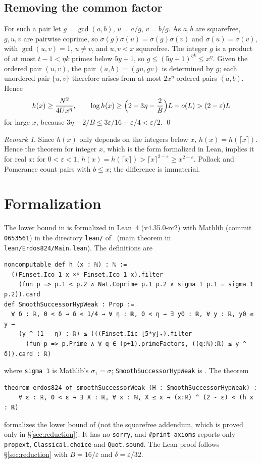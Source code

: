 \documentclass[11pt]{amsart}
\theoremstyle{definition}
\theoremstyle{remark}
\newtheorem{remark}[theorem]{Remark}
\newcommand{\eps}{\varepsilon}
\begin{document}
\subsection{Removing the common factor} For such a pair let $g=\gcd(a,b)$, $u=a/g$, $v=b/g$. As $a,b$ are squarefree, $g,u,v$ are pairwise coprime, so $\sigma(g)\sigma(u)=\sigma(g)\sigma(v)$ and $\sigma(u)=\sigma(v)$, with $\gcd(u,v)=1$, $u\ne v$, and $u,v<x$ squarefree. The integer $g$ is a product of at most $t-1<\eta k$ primes below $5y+1$, so $g\le(5y+1)^{\eta k}\le x^\eta$. Given the ordered pair $(u,v)$, the pair $(a,b)=(gu,gv)$ is determined by $g$; each unordered pair $\{u,v\}$ therefore arises from at most $2x^\eta$ ordered pairs $(a,b)$. Hence
\[
 h(x)\ge\frac{N^2}{4Ux^\eta},\qquad
 \log h(x)\ge\Bigl(2-3\eta-\frac2B\Bigr)L-o(L)>(2-\eps)L
\]
for large $x$, because $3\eta+2/B\le3\eps/16+\eps/4<\eps/2$. \qed

\begin{remark}
Since $h(x)$ only depends on the integers below $x$, $h(x)=h(\lceil x\rceil)$. Hence the theorem for integer $x$, which is the form formalized in Lean, implies it for real $x$: for $0<\eps<1$, $h(x)=h(\lceil x\rceil)>\lceil x\rceil^{2-\eps}\ge x^{2-\eps}$. Pollack and Pomerance count pairs with $b\le x$; the difference is immaterial.
\end{remark}

\section{Formalization}\label{sec:lean}

The lower bound in  is formalized in Lean~4 (v4.35.0-rc2) with Mathlib (commit \texttt{0653561}) in the directory \texttt{lean/} of~\cite{repo} (main theorem in \texttt{lean/Erdos824/Main.lean}). The definitions are
\begin{verbatim}
noncomputable def h (x : ℕ) : ℕ :=
  ((Finset.Ico 1 x ×ˢ Finset.Ico 1 x).filter
    (fun p => p.1 < p.2 ∧ Nat.Coprime p.1 p.2 ∧ sigma 1 p.1 = sigma 1 p.2)).card
def SmoothSuccessorHypWeak : Prop :=
  ∀ δ : ℝ, 0 < δ → δ < 1/4 → ∀ η : ℝ, 0 < η → ∃ y0 : ℝ, ∀ y : ℝ, y0 ≤ y →
    (y ^ (1 - η) : ℝ) ≤ (((Finset.Iic ⌊5*y⌋₊).filter
      (fun p => p.Prime ∧ ∀ q ∈ (p+1).primeFactors, ((q:ℕ):ℝ) ≤ y ^ δ)).card : ℝ)
\end{verbatim}
where \texttt{sigma 1} is Mathlib's $\sigma_1=\sigma$; \texttt{SmoothSuccessorHypWeak} is . The theorem
\begin{verbatim}
theorem erdos824_of_smoothSuccessorWeak (H : SmoothSuccessorHypWeak) :
    ∀ ε : ℝ, 0 < ε → ∃ X : ℝ, ∀ x : ℕ, X ≤ x → (x:ℝ) ^ (2 - ε) < (h x : ℝ)
\end{verbatim}
formalizes the lower bound of  (not the squarefree addendum, which is proved only in \S\ref{sec:reduction}). It has no \texttt{sorry}, and \texttt{\#print axioms} reports only \texttt{propext}, \texttt{Classical.choice} and \texttt{Quot.sound}. The Lean proof follows \S\ref{sec:reduction} with $B=16/\eps$ and $\delta=\eps/32$.
\end{document}
